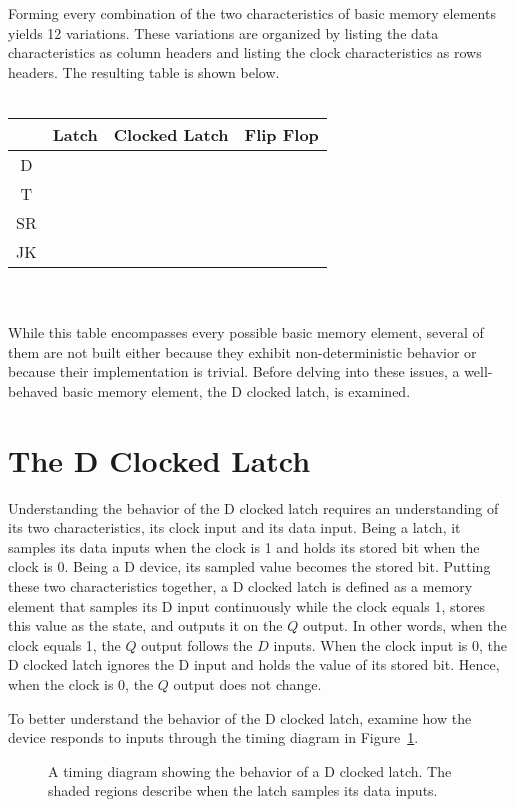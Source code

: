 Forming every combination of the two characteristics of basic
memory elements yields 12 variations.  These variations are
organized by listing the data characteristics as column
headers and listing the clock characteristics as rows headers.
The resulting table is shown below.
\\ \\
\begin{tabular}{|c|c|c|c|}\hline
&  Latch & Clocked Latch  & Flip Flop   \\ \hline
D  &        &      &    \\ \hline
T  &        &     &    \\ \hline
SR &        &      &    \\ \hline
JK &        &     &    \\ \hline
\end{tabular}
\\ \\
While this table encompasses every possible basic memory
element, several of them are not built either because they
exhibit non-deterministic behavior or because their implementation
is trivial.  Before delving into these issues, a well-behaved basic memory
element, the D clocked latch, is examined.

\section{The D Clocked Latch}
Understanding the behavior of the D clocked latch requires
an understanding of its two characteristics, its clock
input and its data input.  Being a latch, it samples its
data inputs when the clock is 1 and holds its stored bit
when the clock is 0.  Being a D device, its sampled value
becomes the stored bit. Putting these two characteristics
together, a D clocked latch is defined as a memory
element that samples its D input continuously while the clock
equals 1, stores this value as the state, and outputs it on
the $Q$ output.  In other words, when the clock equals 1, the
$Q$ output follows the $D$ inputs. When the clock input is 0,
the D clocked latch ignores the D input and holds the value
of its stored bit.  Hence, when the clock is 0, the
$Q$ output does not change.

To better understand the behavior of the D clocked latch,
examine how the device responds to inputs through
the timing diagram in Figure~\ref{fig:sequentialCirDCL}.

\begin{figure}[ht]
\caption{A timing diagram showing the behavior of a D clocked latch.
The shaded regions describe when the latch samples its data inputs.}
\label{fig:sequentialCirDCL}
\end{figure}

